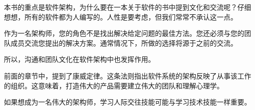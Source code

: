 本书的重点是软件架构，为什么要在一本关于软件的书中提到文化和交流呢？仔细想想，所有的软件都为人编写的。人性是要考虑，但我们常常不承认这一点。

作为一名架构师，您的角色不是找出解决给定问题的最佳方法。您还必须与您的团队成员交流您提出的解决方案。通常情况下，所做的选择将源于之前的交流。

所以，沟通和团队文化在软件架构中也发挥作用。

前面的章节中，提到了康威定律。这条法则指出软件系统的架构反映了从事该工作的组织。这意味着，打造伟大的产品需要建立伟大的团队和理解心理学。

如果想成为一名伟大的架构师，学习人际交往技能可能与学习技术技能一样重要。